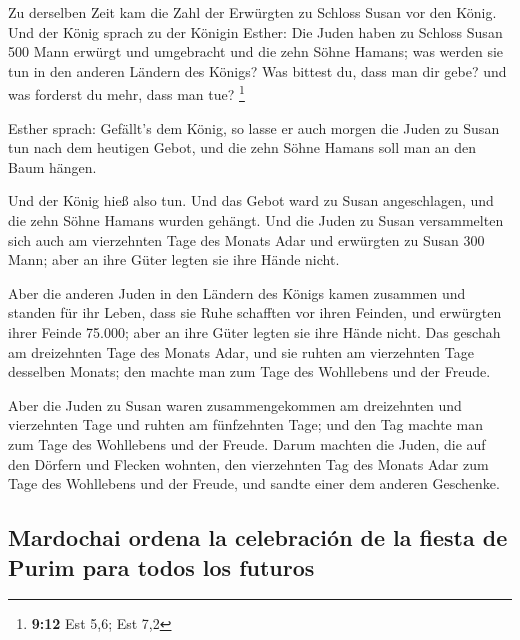  Zu derselben Zeit kam die Zahl der Erwürgten zu Schloss
Susan vor den König.  Und der König sprach zu der Königin
Esther: Die Juden haben zu Schloss Susan 500 Mann erwürgt und umgebracht
und die zehn Söhne Hamans; was werden sie tun in den anderen Ländern des
Königs? Was bittest du, dass man dir gebe? und was forderst du mehr,
dass man tue? \footnote{\textbf{9:12} Est 5,6; Est 7,2}

 Esther sprach: Gefällt's dem König, so lasse er auch
morgen die Juden zu Susan tun nach dem heutigen Gebot, und die zehn
Söhne Hamans soll man an den Baum hängen.

 Und der König hieß also tun. Und das Gebot ward zu Susan
angeschlagen, und die zehn Söhne Hamans wurden gehängt. 
Und die Juden zu Susan versammelten sich auch am vierzehnten Tage des
Monats Adar und erwürgten zu Susan 300 Mann; aber an ihre Güter legten
sie ihre Hände nicht.

 Aber die anderen Juden in den Ländern des Königs kamen
zusammen und standen für ihr Leben, dass sie Ruhe schafften vor ihren
Feinden, und erwürgten ihrer Feinde 75.000; aber an ihre Güter legten
sie ihre Hände nicht.  Das geschah am dreizehnten Tage
des Monats Adar, und sie ruhten am vierzehnten Tage desselben Monats;
den machte man zum Tage des Wohllebens und der Freude.

 Aber die Juden zu Susan waren zusammengekommen am
dreizehnten und vierzehnten Tage und ruhten am fünfzehnten Tage; und den
Tag machte man zum Tage des Wohllebens und der Freude. 
Darum machten die Juden, die auf den Dörfern und Flecken wohnten, den
vierzehnten Tag des Monats Adar zum Tage des Wohllebens und der Freude,
und sandte einer dem anderen Geschenke.

\hypertarget{mardochai-ordena-la-celebraciuxf3n-de-la-fiesta-de-purim-para-todos-los-futuros}{%
\subsection{Mardochai ordena la celebración de la fiesta de Purim para
todos los
futuros}\label{mardochai-ordena-la-celebraciuxf3n-de-la-fiesta-de-purim-para-todos-los-futuros}}

